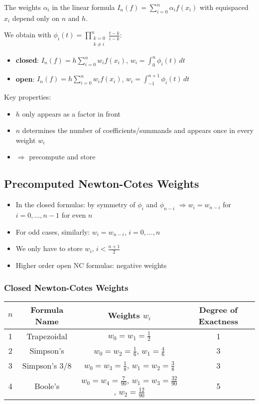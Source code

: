The weights $\alpha_i$ in the linear formula $I_n(f) = \sum_{i=0}^n \alpha_i f(x_i)$ with equispaced $x_i$ depend only on $n$ and $h$.

We obtain with $\phi_i(t) = \prod_{\substack{k=0\\k \neq i}}^n \frac{t-k}{i-k}$:

\begin{itemize}
    \item \textbf{closed}: $I_n(f) = h \sum_{i=0}^n w_i f(x_i)$, $w_i = \int_0^n \phi_i(t) \, dt$
    \item \textbf{open}: $I_n(f) = h \sum_{i=0}^n w_i f(x_i)$, $w_i = \int_{-1}^{n+1} \phi_i(t) \, dt$
\end{itemize}

Key properties:
\begin{itemize}
    \item $h$ only appears as a factor in front
    \item $n$ determines the number of coefficients/summands and appears once in every weight $w_i$
    \item $\Rightarrow$ precompute and store
\end{itemize}

\subsection{Precomputed Newton-Cotes Weights}

\begin{itemize}
    \item In the closed formulas: by symmetry of $\phi_i$ and $\phi_{n-i}$ $\Rightarrow w_i = w_{n-i}$ for $i = 0, \ldots, n-1$ for even $n$
    \item For odd cases, similarly: $w_i = w_{n-i}$, $i = 0, \ldots, n$
    \item We only have to store $w_i$, $i < \frac{n+1}{2}$
    \item Higher order open NC formulas: negative weights
\end{itemize}
\subsubsection{Closed Newton-Cotes Weights}

\begin{center}
\begin{tabular}{|c|c|c|c|}
\hline
$n$ & Formula Name & Weights $w_i$ & Degree of Exactness \\
\hline
1 & Trapezoidal & $w_0 = w_1 = \frac{1}{2}$ & 1 \\
\hline
2 & Simpson's & $w_0 = w_2 = \frac{1}{6}$, $w_1 = \frac{4}{6}$ & 3 \\
\hline
3 & Simpson's 3/8 & $w_0 = w_3 = \frac{1}{8}$, $w_1 = w_2 = \frac{3}{8}$ & 3 \\
\hline
4 & Boole's & $w_0 = w_4 = \frac{7}{90}$, $w_1 = w_3 = \frac{32}{90}$, $w_2 = \frac{12}{90}$ & 5 \\
\hline
\end{tabular}
\end{center}

